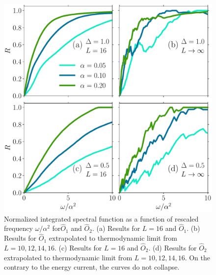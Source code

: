 \begin{figure}[ht]
  \centering
  \includegraphics[width=\figsize\textwidth]{Figures/O12_quadratic_scaling_small.pdf}
  \caption{Normalized integrated spectral function as a function of rescaled 
  frequency \(\omega/\alpha^2\) for\(\hat{O}_1\) and \(\hat{O}_2\).
  (a) Results for \(L=16\) and \(\hat{O}_1\).  (b) Results for \(\hat{O}_1\) extrapolated to
  thermodynamic limit from \(L=10,12,14,16\). (c) Results for \(L=16\) and \(\hat{O}_2\). 
  (d) Results for \(\hat{O}_2\) extrapolated to thermodynamic limit from \(L=10,12,14,16\).
  On the contrary to the energy current, the curves do not collapse.}\label{fig:O12 quadratic scaling}
\end{figure}
